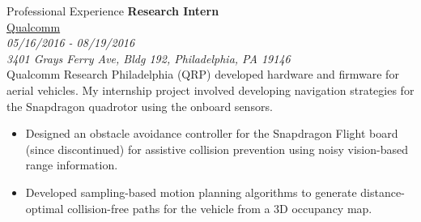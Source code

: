 \documentclass[9pt]{article}
\begin{document}
\begin{rsection}{Professional Experience}
    \textbf{Research Intern} \\
    \href{https://www.qualcomm.com/research}{Qualcomm} \\
    \textit{05/16/2016 - 08/19/2016} \\
    \textit{3401 Grays Ferry Ave, Bldg 192, Philadelphia, PA 19146}
    \vspace{0.5em} \\
    Qualcomm Research Philadelphia (QRP) developed hardware and firmware for aerial vehicles. My internship project involved developing navigation strategies for the Snapdragon quadrotor using the onboard sensors.
    \begin{itemize}
        \item Designed an obstacle avoidance controller for the Snapdragon Flight board (since discontinued) for assistive collision prevention using noisy vision-based range information.
        \item Developed sampling-based motion planning algorithms to generate distance-optimal collision-free paths for the vehicle from a 3D occupancy map.
    \end{itemize}
\end{rsection}
\end{document}
